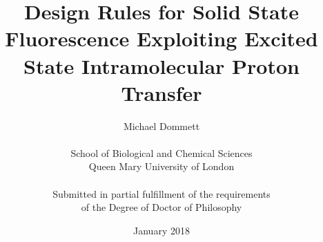 \documentclass[a4paper,11.5pt]{report}
\begin{document}
\setlength{\TPHorizModule}{200mm} 
\setlength{\TPVertModule}{100mm} 
\textblockorigin{61mm}{19mm}






\providecommand{\OT}[1]{\operatorname{\Theta}\bigl(#1\bigr)}
\providecommand{\OOm}[1]{\operatorname{\Omega}\bigl(#1\bigr)}



\title{\huge
\textbf{Design Rules for Solid State Fluorescence Exploiting Excited State Intramolecular Proton Transfer}}
\author{Michael Dommett \\
\\
School of Biological and Chemical Sciences\\
Queen Mary University of London\\
\\
Submitted in partial fulfillment of the requirements\\ of the Degree of Doctor of Philosophy}

\date{January 2018}

\maketitle

  
\setcounter{page}{2}


\tableofcontents
\listoffigures
\listoftables










\appendix
\appendixpage
\setcounter{figure}{0} \renewcommand{\thefigure}{A\arabic{figure}}
\renewcommand{\thetable}{A\arabic{figure}}
\end{document}
